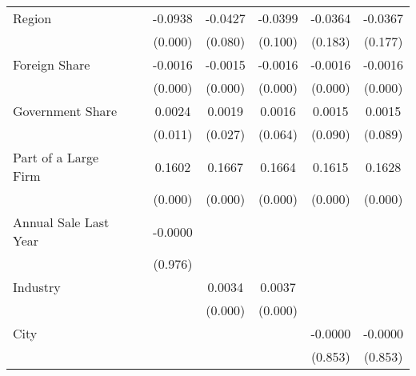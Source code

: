{\begin{tabular}{l*{6}{c}}
Region              &                     &     -0.0938\sym{***}&     -0.0427         &     -0.0399         &     -0.0364         &     -0.0367         \\
                    &                     &     (0.000)         &     (0.080)         &     (0.100)         &     (0.183)         &     (0.177)         \\
Foreign Share       &                     &     -0.0016\sym{***}&     -0.0015\sym{***}&     -0.0016\sym{***}&     -0.0016\sym{***}&     -0.0016\sym{***}\\
                    &                     &     (0.000)         &     (0.000)         &     (0.000)         &     (0.000)         &     (0.000)         \\
Government Share    &                     &      0.0024\sym{*}  &      0.0019\sym{*}  &      0.0016         &      0.0015         &      0.0015         \\
                    &                     &     (0.011)         &     (0.027)         &     (0.064)         &     (0.090)         &     (0.089)         \\
Part of a Large Firm&                     &      0.1602\sym{***}&      0.1667\sym{***}&      0.1664\sym{***}&      0.1615\sym{***}&      0.1628\sym{***}\\
                    &                     &     (0.000)         &     (0.000)         &     (0.000)         &     (0.000)         &     (0.000)         \\
Annual Sale Last Year&                     &     -0.0000         &                     &                     &                     &                     \\
                    &                     &     (0.976)         &                     &                     &                     &                     \\
Industry            &                     &                     &      0.0034\sym{***}&      0.0037\sym{***}&                     &                     \\
                    &                     &                     &     (0.000)         &     (0.000)         &                     &                     \\
City                &                     &                     &                     &                     &     -0.0000         &     -0.0000         \\
                    &                     &                     &                     &                     &     (0.853)         &     (0.853)         \\

\end{tabular}}
